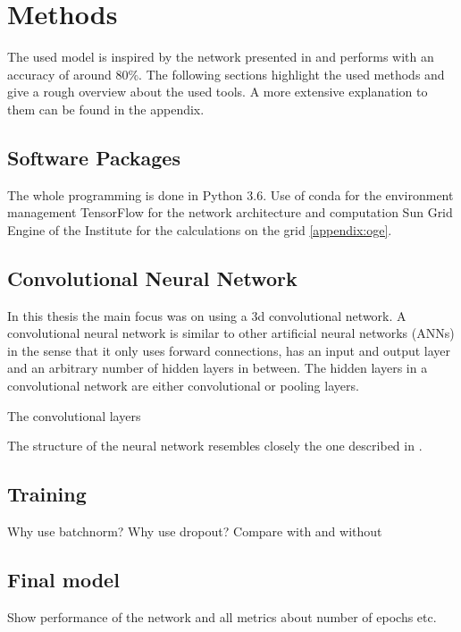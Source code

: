 \documentclass[main.tex]{subfiles}
\begin{document}
\chapter{Methods}
The used model is inspired by the network presented in \cite{huang2017lung} and performs with an accuracy of around 80$\%$. The following sections highlight the used methods and give a rough overview about the used tools. A more extensive explanation to them can be found in the appendix.


\section{Software Packages}
The whole programming is done in Python 3.6. 
Use of conda for the environment management 
TensorFlow for the network architecture and computation
Sun Grid Engine of the Institute for the calculations on the grid \ref{appendix:oge}.


\section{Convolutional Neural Network}
In this thesis the main focus was on using a 3d convolutional network. A convolutional neural network is similar to other artificial neural networks (ANNs) in the sense that it only uses forward connections, has an input and output layer and an arbitrary number of hidden layers in between. The hidden layers in a convolutional network are either convolutional or pooling layers.

The convolutional layers



The structure of the neural network resembles closely the one described in \cite{huang2017lung}. 



\section{Training}
Why use batchnorm?
Why use dropout?
Compare with and without

\section{Final model}
Show performance of the network and all metrics about number of epochs etc.
\end{document}

